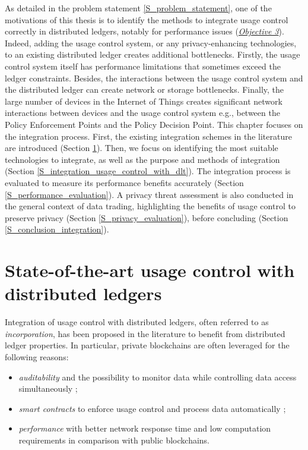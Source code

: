 \minitoc

As detailed in the problem statement \ref{S_problem_statement}, one of the motivations of this thesis is to identify the methods to integrate usage control correctly in distributed ledgers, notably for performance issues (\hyperref[obj:23]{\emph{Objective 3}}). Indeed, adding the usage control system, or any privacy-enhancing technologies, to an existing distributed ledger creates additional bottlenecks. Firstly, the usage control system itself has performance limitations that sometimes exceed the ledger constraints. Besides, the interactions between the usage control system and the distributed ledger can create network or storage bottlenecks. Finally, the large number of devices in the Internet of Things creates significant network interactions between devices and the usage control system e.g., between the Policy Enforcement Points and the Policy Decision Point. This chapter focuses on the integration process. First, the existing integration schemes in the literature are introduced (Section \ref{S_state_of_the_art_ucon_dlt}). Then, we focus on identifying the most suitable technologies to integrate, as well as the purpose and methods of integration (Section \ref{S_integration_usage_control_with_dlt}). The integration process is evaluated to measure its performance benefits accurately (Section \ref{S_performance_evaluation}). A privacy threat assessment is also conducted in the general context of data trading, highlighting the benefits of usage control to preserve privacy (Section \ref{S_privacy_evaluation}), before concluding (Section \ref{S_conclusion_integration}).

\section{State-of-the-art usage control with distributed ledgers}
\label{S_state_of_the_art_ucon_dlt}

Integration of usage control with distributed ledgers, often referred to as \emph{incorporation}, has been proposed in the literature to benefit from distributed ledger properties. In particular, private blockchains are often leveraged for the following reasons:
\begin{itemize}
    \item \emph{auditability} and the possibility to monitor data while controlling data access simultaneously \cite{Khan2020, Ma2020};
    \item \emph{smart contracts} to enforce usage control and process data automatically \cite{Ma2020, Zhang2022}; 
    \item \emph{performance} with better network response time and low computation requirements \cite{Salimitari2020} in comparison with public blockchains.
\end{itemize}

